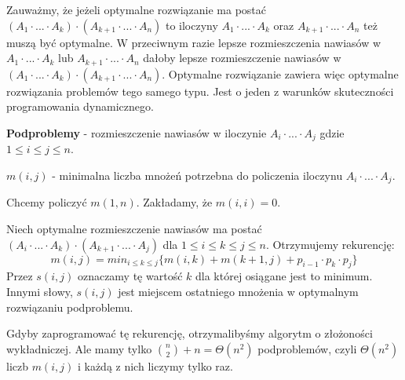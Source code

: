 Zauważmy, że jeżeli optymalne rozwiązanie ma postać $(A_1 \cdot ... \cdot A_k) \cdot (A_{k+1} \cdot ... \cdot A_n)$ to iloczyny $A_1 \cdot ... \cdot A_k$ oraz $A_{k+1} \cdot ... \cdot A_n$  też muszą być optymalne. W przeciwnym razie lepsze rozmieszczenia nawiasów w $A_1 \cdot ... \cdot A_k$ lub $A_{k+1} \cdot ... \cdot A_n$ dałoby lepsze rozmieszczenie nawiasów w $(A_1 \cdot ... \cdot A_k) \cdot (A_{k+1} \cdot ... \cdot A_n)$. Optymalne rozwiązanie zawiera więc optymalne rozwiązania problemów tego samego typu. Jest o jeden z warunków skuteczności programowania dynamicznego.


\textbf{Podproblemy} - rozmieszczenie nawiasów w iloczynie $A_i \cdot ... \cdot A_j$ gdzie $1 \leq i \leq j \leq n$. 

$m(i,j)$ - minimalna liczba mnożeń potrzebna do policzenia iloczynu $A_i \cdot ... \cdot A_j$.

Chcemy policzyć $m(1,n)$. Zakładamy, że $m(i,i) = 0$. 

Niech optymalne rozmieszczenie nawiasów ma postać $(A_i \cdot ... \cdot A_k) \cdot (A_{k+1} \cdot ... \cdot A_j)$ dla $1 \leq  i \leq k \leq j \leq n$. Otrzymujemy rekurencję: 
$$m(i,j) = min_{i \leq k \leq j} \{ m(i,k) +m(k+1,j) + p_{i-1} \cdot p_k \cdot p_j \}$$
Przez $s(i,j)$ oznaczamy tę wartość $k$ dla której osiągane jest to minimum. Innymi słowy, $s(i,j)$ jest miejscem ostatniego mnożenia w optymalnym rozwiązaniu podproblemu. 

Gdyby zaprogramować tę rekurencję, otrzymalibyśmy algorytm o złożoności wykładniczej. Ale mamy tylko $\binom{n}{2} + n = \Theta(n^2)$ podproblemów, czyli $\Theta(n^2)$ liczb $m(i,j)$ i każdą z nich liczymy tylko raz.
